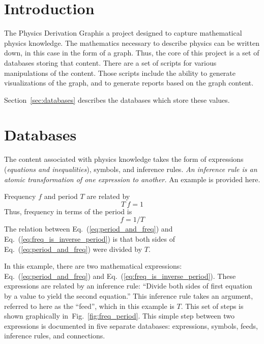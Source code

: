 \documentclass{article}
\newcommand{\eqn}[1]{Eq.\ (\ref{#1})}
\newcommand{\pdg}{Physics Derivation Graph}
\begin{document}
\begin{multicols}{2}



\section{Introduction}

The \pdg is a project designed to capture mathematical physics knowledge. The mathematics necessary to describe physics can be written down, in this case in the form of a graph. Thus, the core of this project is a set of databases storing that content. There are a set of scripts for various manipulations of the content. Those scripts include the ability to generate visualizations of the graph, and to generate reports based on the graph content.

 Section~\ref{sec:databases} describes the databases which store these values. 

\section{Databases\label{sec:databases}}

The content associated with physics knowledge takes the form of expressions (\textit{equations and inequalities}), symbols, and inference rules. \textit{An inference rule is an atomic transformation of one expression to another.} An example is provided here. 

Frequency $f$ and period $T$ are related by
\begin{equation}
T\ f = 1
\label{eq:period_and_freq}
\end{equation}
Thus, frequency in terms of the period is
\begin{equation}
f = 1/T
\label{eq:freq_is_inverse_period}
\end{equation}
The relation between \eqn{eq:period_and_freq} and \eqn{eq:freq_is_inverse_period} is that both sides of \eqn{eq:period_and_freq} were divided by $T$. 

In this example, there are two mathematical expressions: \eqn{eq:period_and_freq} and \eqn{eq:freq_is_inverse_period}. These expressions are related by an inference rule: ``Divide both sides of first equation by a value to yield the second equation.'' This inference rule takes an argument, referred to here as the ``feed'', which in this example is $T$. This set of steps is shown graphically in~Fig.~\ref{fig:freq_period}. This simple step between two expressions is documented in five separate databases: expressions, symbols, feeds, inference rules, and connections. 


\end{multicols}
\end{document}
